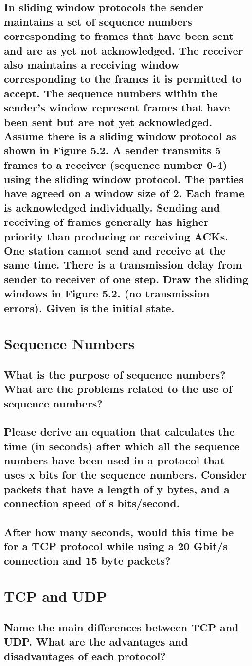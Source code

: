 \documentclass[a4paper,
			llpt,
			solution,
			accentcolor=tud2d,
			colorbacktitle
			]
			{tudexercise}
\begin{document}
\subsection{In sliding window protocols the sender maintains a set of sequence numbers corresponding to frames that have been sent and are as yet not acknowledged. The receiver also maintains a receiving window corresponding to the frames it is permitted to accept. The sequence numbers within the sender’s window represent frames that have been sent but are not yet acknowledged. Assume there is a sliding window protocol as shown in Figure 5.2. A sender transmits 5 frames to a receiver (sequence number 0-4) using the sliding window protocol. The parties have agreed on a window size of 2. Each frame is acknowledged individually. Sending and receiving of frames generally has higher priority than producing or receiving ACKs. One station cannot send and receive at the same time. There is a transmission delay from sender to receiver of one step. Draw the sliding windows in Figure 5.2. (no transmission errors). Given is the initial state.}
\section{Sequence Numbers}
\subsection{What is the purpose of sequence numbers? What are the problems related to the use of sequence numbers?}
\subsection{Please derive an equation that calculates the time (in seconds) after which all the sequence numbers have been used in a protocol that uses x bits for the sequence numbers. Consider packets that have a length of y bytes, and a connection speed of s bits/second.}
\subsection{After how many seconds, would this time be for a TCP protocol while using a 20 Gbit/s connection and 15 byte packets?}
\section{TCP and UDP}
\subsection{Name the main differences between TCP and UDP. What are the advantages and disadvantages of each protocol?}
\end{document}
